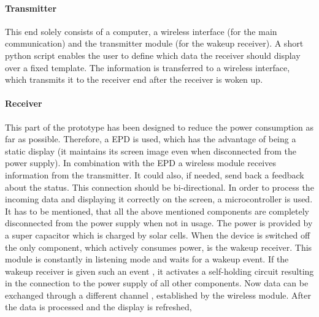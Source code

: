 \paragraph{Transmitter}
This end solely consists of a computer, a wireless interface (for the main communication) and the transmitter module (for the wakeup receiver). A short python script enables the user to define which data the receiver should display over a fixed template. The information is transferred to a wireless interface, which transmits it to the receiver end after the receiver is woken up.

\paragraph{Receiver}
This part of the prototype has been designed to reduce the power consumption as far as possible. Therefore, a EPD is used, which has the advantage of being a static display (it maintains its screen image even when disconnected from the power supply). In combination with the EPD a wireless module receives information from the transmitter. It could also, if needed, send back a feedback about the status. This connection should be bi-directional.  In order to process the incoming data and displaying it correctly on the screen, a microcontroller is used. It has to be mentioned, that all the above mentioned components  are completely disconnected from the power supply when not in usage. The power is provided by a super capacitor which is charged by solar cells. When the device  is switched off the only component, which actively consumes power, is the wakeup receiver. This module is constantly in listening mode and waits for a wakeup event. If the wakeup receiver is given such an event , it activates a self-holding circuit resulting in the connection to the power supply of all other components. Now data can be exchanged through a different channel , established by the wireless module. After the data is processed and the display is refreshed,  